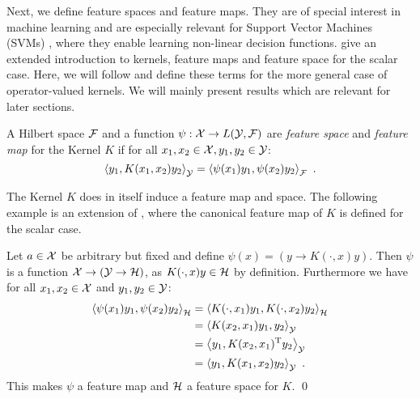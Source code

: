 Next, we define feature spaces and feature maps.
They are of special interest in machine learning and are especially relevant for Support Vector Machines (SVMs) \cite{steinwart08}, where they enable learning non-linear decision functions.
\citet{steinwart08} give an extended introduction to kernels, feature maps and feature space for the scalar case.
Here, we will follow \cite{owhadi20} and define these terms for the more general case of operator-valued kernels.
We will mainly present results which are relevant for later sections.

\begin{definition}
	\label{def:feature-map-space}
	A Hilbert space $\mathcal{F}$ and a function $\psi: \mathcal{X} \rightarrow L(\mathcal{Y}, \mathcal{F})$ are \emph{feature space} and \emph{feature map} for the Kernel $K$ if for all $x_1, x_2 \in \mathcal{X}, y_1, y_2 \in \mathcal{Y}$:
	\begin{equation}
		\left< y_1, K(x_1, x_2) y_2\right>_{\mathcal{Y}} = \left< \psi(x_1) y_1, \psi(x_2) y_2\right>_{\mathcal{F}} \ .
	\end{equation}
\end{definition}

The Kernel $K$ does in itself induce a feature map and space.
The following example is an extension of \cite[Lemma~4.19]{steinwart08}, where the canonical feature map of $K$ is defined for the scalar case.
\begin{example}
	Let $a \in \mathcal{X}$ be arbitrary but fixed and define $\psi(x) = \left(y \rightarrow K(\cdot, x)y\right)$.
	Then $\psi$ is a function $\mathcal{X} \rightarrow \left(\mathcal{Y} \rightarrow \mathcal{H}\right)$, as $K(\cdot, x) y \in \mathcal{H}$ by definition.
	Furthermore we have for all $x_1, x_2 \in \mathcal{X}$ and $y_1, y_2 \in \mathcal{Y}$:
	\begin{align}
		\left<\psi(x_1) y_1, \psi(x_2)y_2 \right>_{\mathcal{H}} &= 
		\left< K(\cdot, x_1) y_1, K(\cdot, x_2) y_2\right>_{\mathcal{H}}\\
		& = \left< K(x_2, x_1) y_1, y_2 \right>_{\mathcal{Y}} \\
		& = \left< y_1, K(x_2, x_1)^{\mathrm{T}} y_2 \right>_{\mathcal{Y}}\\
		& = \left< y_1, K(x_1, x_2) y_2\right>_{\mathcal{Y}} \ .		
	\end{align}
	This makes $\psi$ a feature map and $\mathcal{H}$ a feature space for $K$. \qed
\end{example}

